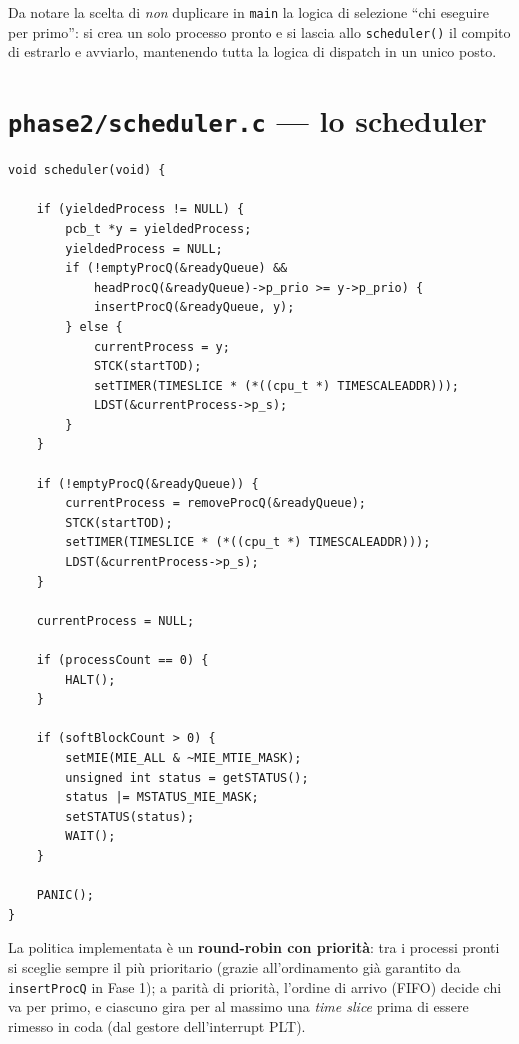 \documentclass[11pt,a4paper]{article}
\newcommand{\code}[1]{\texttt{#1}}
\begin{document}
Da notare la scelta di \emph{non} duplicare in \code{main} la logica di
selezione ``chi eseguire per primo'': si crea un solo processo pronto e si
lascia allo \code{scheduler()} il compito di estrarlo e avviarlo, mantenendo
tutta la logica di dispatch in un unico posto.

\section{\code{phase2/scheduler.c} --- lo scheduler}

\begin{lstlisting}
void scheduler(void) {

    if (yieldedProcess != NULL) {
        pcb_t *y = yieldedProcess;
        yieldedProcess = NULL;
        if (!emptyProcQ(&readyQueue) &&
            headProcQ(&readyQueue)->p_prio >= y->p_prio) {
            insertProcQ(&readyQueue, y);
        } else {
            currentProcess = y;
            STCK(startTOD);
            setTIMER(TIMESLICE * (*((cpu_t *) TIMESCALEADDR)));
            LDST(&currentProcess->p_s);
        }
    }

    if (!emptyProcQ(&readyQueue)) {
        currentProcess = removeProcQ(&readyQueue);
        STCK(startTOD);
        setTIMER(TIMESLICE * (*((cpu_t *) TIMESCALEADDR)));
        LDST(&currentProcess->p_s);
    }

    currentProcess = NULL;

    if (processCount == 0) {
        HALT();
    }

    if (softBlockCount > 0) {
        setMIE(MIE_ALL & ~MIE_MTIE_MASK);
        unsigned int status = getSTATUS();
        status |= MSTATUS_MIE_MASK;
        setSTATUS(status);
        WAIT();
    }

    PANIC();
}
\end{lstlisting}

La politica implementata è un \textbf{round-robin con priorità}: tra i
processi pronti si sceglie sempre il più prioritario (grazie
all'ordinamento già garantito da \code{insertProcQ} in Fase 1); a parità di
priorità, l'ordine di arrivo (FIFO) decide chi va per primo, e ciascuno gira
per al massimo una \emph{time slice} prima di essere rimesso in coda (dal
gestore dell'interrupt PLT).
\end{document}
